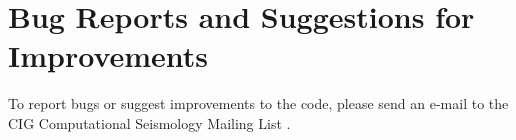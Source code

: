 \chapter*{Bug Reports and Suggestions for Improvements}\label{cha:Bug-Reports-and}

To report bugs or suggest improvements to the code, please send an
e-mail to the CIG Computational Seismology Mailing List .


